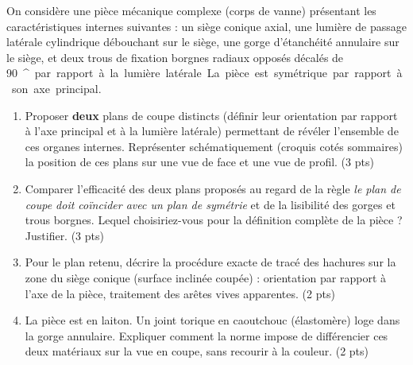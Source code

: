 \documentclass[11pt]{article}
\providecommand{\degree}{^{\circ}}
\begin{document}
\begin{exercice}
On considère une pièce mécanique complexe (corps de vanne) présentant les caractéristiques internes suivantes : un siège conique axial, une lumière de passage latérale cylindrique débouchant sur le siège, une gorge d'étanchéité annulaire sur le siège, et deux trous de fixation borgnes radiaux opposés décalés de \SI{90}{\degree} par rapport à la lumière latérale. La pièce est symétrique par rapport à son axe principal.
\begin{enumerate}
    \item Proposer \textbf{deux} plans de coupe distincts (définir leur orientation par rapport à l'axe principal et à la lumière latérale) permettant de révéler l'ensemble de ces organes internes. Représenter schématiquement (croquis cotés sommaires) la position de ces plans sur une vue de face et une vue de profil. (3 pts)
    \item Comparer l'efficacité des deux plans proposés au regard de la règle \og \textit{le plan de coupe doit coïncider avec un plan de symétrie} \fg et de la lisibilité des gorges et trous borgnes. Lequel choisiriez-vous pour la définition complète de la pièce ? Justifier. (3 pts)
    \item Pour le plan retenu, décrire la procédure exacte de tracé des hachures sur la zone du siège conique (surface inclinée coupée) : orientation par rapport à l'axe de la pièce, traitement des arêtes vives apparentes. (2 pts)
    \item La pièce est en laiton. Un joint torique en caoutchouc (élastomère) loge dans la gorge annulaire. Expliquer comment la norme impose de différencier ces deux matériaux sur la vue en coupe, sans recourir à la couleur. (2 pts)
\end{enumerate}
\end{exercice}
\end{document}
